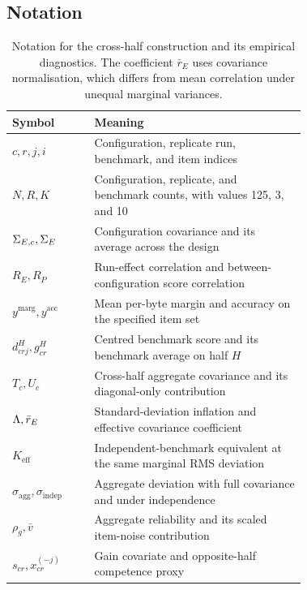 \subsection{Notation}
\begin{table}[h]
\centering
\caption{Notation for the cross-half construction and its empirical diagnostics. The coefficient $\bar r_E$ uses covariance normalisation, which differs from mean correlation under unequal marginal variances.}\label{tab:notation}
\small\setlength{\tabcolsep}{4pt}\renewcommand{\arraystretch}{1.12}
\begin{tabular}{lL{0.72\linewidth}}
\toprule
Symbol & Meaning\\
\midrule
$c,r,j,i$ & Configuration, replicate run, benchmark, and item indices\\
$N,R,K$ & Configuration, replicate, and benchmark counts, with values 125, 3, and 10\\
$\Sigma_{E,c},\Sigma_E$ & Configuration covariance and its average across the design\\
$R_E,R_P$ & Run-effect correlation and between-configuration score correlation\\
$y^{\mathrm{marg}},y^{\mathrm{acc}}$ & Mean per-byte margin and accuracy on the specified item set\\
$d^H_{crj},g^H_{cr}$ & Centred benchmark score and its benchmark average on half $H$\\
$T_c,U_c$ & Cross-half aggregate covariance and its diagonal-only contribution\\
$\Lambda,\bar r_E$ & Standard-deviation inflation and effective covariance coefficient\\
$K_{\mathrm{eff}}$ & Independent-benchmark equivalent at the same marginal RMS deviation\\
$\sigma_{\mathrm{agg}},\sigma_{\mathrm{indep}}$ & Aggregate deviation with full covariance and under independence\\
$\rho_g,\bar v$ & Aggregate reliability and its scaled item-noise contribution\\
$s_{cr},x_{cr}^{(-j)}$ & Gain covariate and opposite-half competence proxy\\
\bottomrule
\end{tabular}
\end{table}

